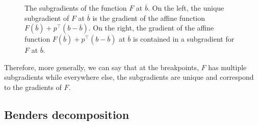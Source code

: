 \begin{figure}[h]
	\caption{The subgradients of the function $F$ at $\overline{b}$. On the left, the unique subgradient of $F$ at $\overline{b}$ is the gradient of the affine function $F(\overline{b}) + p^\top(b - \overline{b})$. On the right, the gradient of the affine function $F(\overline{b}) + p^\top(b - \overline{b})$ at $\overline{b}$ is contained in a subgradient for $F$ at $\overline{b}$.} \label{p1c7:fig:b_function}
\end{figure}



Therefore, more generally, we can say that at the breakpoints, $F$ has multiple subgradients while everywhere else, the subgradients are unique and correspond to the gradients of $F$.


\subsection{Benders decomposition}

